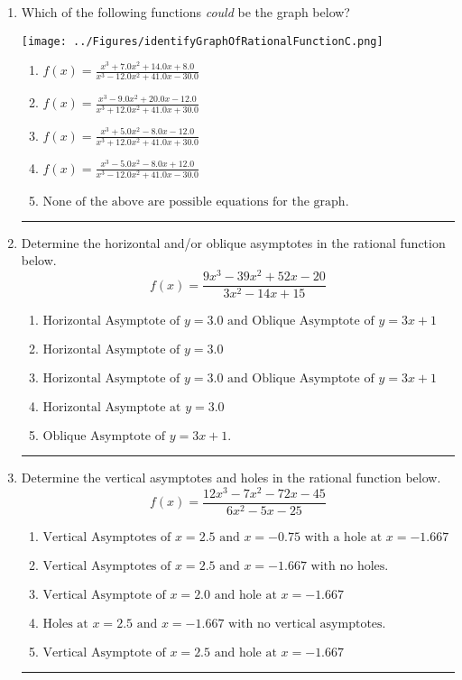 \documentclass[14pt]{extbook}
\newcommand{\litem}[1]{\item#1\hspace*{-1cm}\rule{\textwidth}{0.4pt}}
\begin{document}
\begin{enumerate}
\litem{
Which of the following functions \textit{could} be the graph below?
\begin{center}
    \texttt{[image: ../Figures/identifyGraphOfRationalFunctionC.png]}
\end{center}
\begin{enumerate}[label=\Alph*.]
\item \( f(x)=\frac{x^{3} +7.0 x^{2} +14.0 x + 8.0}{x^{3} -12.0 x^{2} +41.0 x -30.0} \)
\item \( f(x)=\frac{x^{3} -9.0 x^{2} +20.0 x -12.0}{x^{3} +12.0 x^{2} +41.0 x + 30.0} \)
\item \( f(x)=\frac{x^{3} +5.0 x^{2} -8.0 x -12.0}{x^{3} +12.0 x^{2} +41.0 x + 30.0} \)
\item \( f(x)=\frac{x^{3} -5.0 x^{2} -8.0 x + 12.0}{x^{3} -12.0 x^{2} +41.0 x -30.0} \)
\item \( \text{None of the above are possible equations for the graph.} \)

\end{enumerate} }
\litem{
Determine the horizontal and/or oblique asymptotes in the rational function below.\[ f(x) = \frac{9x^{3} -39 x^{2} +52 x -20}{3x^{2} -14 x + 15} \]\begin{enumerate}[label=\Alph*.]
\item \( \text{Horizontal Asymptote of } y = 3.0 \text{ and Oblique Asymptote of } y = 3x + 1 \)
\item \( \text{Horizontal Asymptote of } y = 3.0  \)
\item \( \text{Horizontal Asymptote of } y = 3.0 \text{ and Oblique Asymptote of } y = 3x + 1 \)
\item \( \text{Horizontal Asymptote at } y = 3.0 \)
\item \( \text{Oblique Asymptote of } y = 3x + 1. \)

\end{enumerate} }
\litem{
Determine the vertical asymptotes and holes in the rational function below.\[ f(x) = \frac{12x^{3} -7 x^{2} -72 x -45}{6x^{2} -5 x -25} \]\begin{enumerate}[label=\Alph*.]
\item \( \text{Vertical Asymptotes of } x = 2.5 \text{ and } x = -0.75 \text{ with a hole at } x = -1.667 \)
\item \( \text{Vertical Asymptotes of } x = 2.5 \text{ and } x = -1.667 \text{ with no holes.} \)
\item \( \text{Vertical Asymptote of } x = 2.0 \text{ and hole at } x = -1.667 \)
\item \( \text{Holes at } x = 2.5 \text{ and } x = -1.667 \text{ with no vertical asymptotes.} \)
\item \( \text{Vertical Asymptote of } x = 2.5 \text{ and hole at } x = -1.667 \)


\end{enumerate}}
\end{enumerate}
\end{document}

